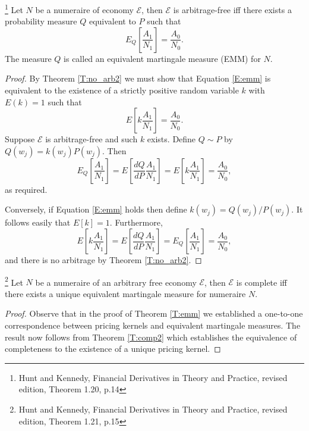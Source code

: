 \begin{theorem} \label{T:emm}
\footnote{Hunt and Kennedy, Financial Derivatives in Theory and Practice, 
    revised edition, Theorem 1.20, p.14}
Let $N$ be a numeraire of economy $\mathcal{E}$, then $\mathcal{E}$ is 
arbitrage-free iff there exists a probability measure $Q$ equivalent to $P$ such
that
\begin{equation} \label{E:emm}
  E_Q\left[ \frac{A_1}{N_1}  \right] = \frac{A_0}{N_0}.
\end{equation}
The measure $Q$ is called an equivalent martingale measure (EMM) for $N$.
\end{theorem}
\begin{proof}
By Theorem \ref{T:no_arb2} we must show that Equation \ref{E:emm} is equivalent
to the existence of a strictly positive random variable $k$ with $E(k)=1$ such
that
\[
  E\left[ k \frac{A_1}{N_1} \right] = \frac{A_0}{N_0}.
\]
Suppose $\mathcal{E}$ is arbitrage-free and such $k$ exists. Define $Q\sim P$ by
$Q(w_j)=k(w_j) P(w_j)$. Then
\[
  E_Q \left[ \frac{A_1}{N_1} \right] 
  =  E\left[ \frac{dQ}{dP} \frac{A_1}{N_1} \right] 
  =  E\left[ k \frac{A_1}{N_1} \right] 
  = \frac{A_0}{N_0},
\]
as required.

Conversely, if Equation \ref{E:emm} holds then define $k(w_j)=Q(w_j)/ P(w_j)$. 
It follows easily that $E[k]=1$. Furthermore,
\[
  E\left[ k \frac{A_1}{N_1} \right] 
  =  E\left[ \frac{dQ}{dP} \frac{A_1}{N_1} \right] 
  = E_Q \left[ \frac{A_1}{N_1} \right] 
  = \frac{A_0}{N_0},
\]
and there is no arbitrage by Theorem \ref{T:no_arb2}.
\end{proof}

\begin{theorem}
\footnote{Hunt and Kennedy, Financial Derivatives in Theory and Practice, 
    revised edition, Theorem 1.21, p.15}
Let $N$ be a numeraire of an arbitrary free economy $\mathcal{E}$, then 
$\mathcal{E}$ is complete iff there exists a unique equivalent martingale
measure for numeraire $N$.
\end{theorem}  
\begin{proof}
Observe that in the proof of Theorem \ref{T:emm} we established a one-to-one
correspondence between pricing kernels and equivalent martingale measures. The
result now follows from Theorem \ref{T:comp2} which establishes the equivalence
of completeness to the existence of a unique pricing kernel.
\end{proof}

